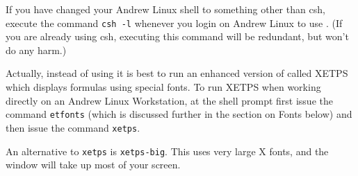 \documentclass{article}
\begin{document}
If you have changed your Andrew Linux shell to something other than csh,
execute the command  \newline{}
{\tt csh -l}\newline{}
whenever you login on Andrew Linux to use  {\ETPS}. (If you are already using
csh, executing this command will be redundant, but won't do any harm.)

Actually, instead of using {\ETPS} it is best to run an enhanced
version of {\ETPS} called  XETPS which displays formulas using
special fonts. To run  XETPS when working directly on an
Andrew Linux Workstation, at the shell prompt first issue the
command \newline{}
{\tt etfonts} \newline{}
(which is discussed further in the section on
Fonts below) and then issue the command \newline{}
{\tt xetps}.

An alternative to {\tt xetps} is {\tt xetps-big}.  This uses very
large X fonts, and the window will take up most of your screen.

\begin{comment}



seemed to make setting the fontpath necessary again, but this
subsection is still not used.


\subsubsection{Setting the Fontpath}

If you sourced the file /afs/andrew.cmu.edu/mcs/math/etps/etps.cshrc in your
$\sim$/.cshrc file, it will tell your X server where the fonts are.  
If you did not source it, but you wish to use XETPS or XETPS-BIG,
you should place the line\newline
\verb=/afs/andrew.cmu.edu/mcs/math/etps/etps.Xclients=\newline
in your $\sim$/.Xclients
file 
 or your $\sim$/.xinitrc file
(if you are using one), or issue that command at the shell prompt once
the window system has started up.
Alternatively, just issue the command:\newline{}
{\tt xset +fp /afs/andrew.cmu.edu/mcs/math/etps/fonts/decfonts/}\newline{}
or\newline{}
{\tt /usr/misc/bin/xset fp+ /afs/andrew.cmu.edu/mcs/math/etps/fonts/decfonts/}

\pagebreak

\end{comment}
\end{document}

